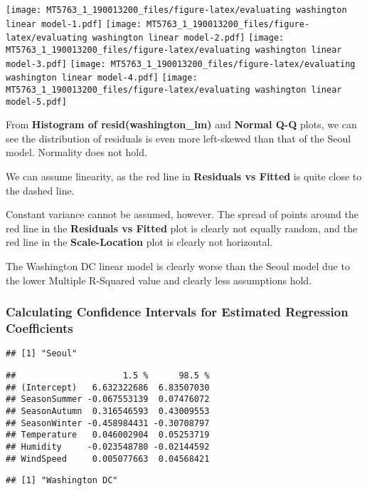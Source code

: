 \documentclass[]{article}
\begin{document}
\texttt{[image: MT5763\_1\_190013200\_files/figure-latex/evaluating washington linear model-1.pdf]}
\texttt{[image: MT5763\_1\_190013200\_files/figure-latex/evaluating washington linear model-2.pdf]}
\texttt{[image: MT5763\_1\_190013200\_files/figure-latex/evaluating washington linear model-3.pdf]}
\texttt{[image: MT5763\_1\_190013200\_files/figure-latex/evaluating washington linear model-4.pdf]}
\texttt{[image: MT5763\_1\_190013200\_files/figure-latex/evaluating washington linear model-5.pdf]}

From \textbf{Histogram of resid(washington\_lm)} and \textbf{Normal Q-Q}
plots, we can see the distribution of residuals is even more left-skewed
than that of the Seoul model. Normality does not hold.

We can assume linearity, as the red line in \textbf{Residuals vs Fitted}
is quite close to the dashed line.

Constant variance cannot be assumed, however. The spread of points
around the red line in the \textbf{Residuals vs Fitted} plot is clearly
not equally random, and the red line in the \textbf{Scale-Location} plot
is clearly not horizontal.

The Washington DC linear model is clearly worse than the Seoul model due
to the lower Multiple R-Squared value and clearly less assumptions hold.

\hypertarget{calculating-confidence-intervals-for-estimated-regression-coefficients}{%
\subsubsection{Calculating Confidence Intervals for Estimated Regression
Coefficients}\label{calculating-confidence-intervals-for-estimated-regression-coefficients}}

\begin{verbatim}
## [1] "Seoul"
\end{verbatim}

\begin{verbatim}
##                     1.5 %      98.5 %
## (Intercept)   6.632322686  6.83507030
## SeasonSummer -0.067553139  0.07476072
## SeasonAutumn  0.316546593  0.43009553
## SeasonWinter -0.458984431 -0.30708797
## Temperature   0.046002904  0.05253719
## Humidity     -0.023548780 -0.02144592
## WindSpeed     0.005077663  0.04568421
\end{verbatim}

\begin{verbatim}
## [1] "Washington DC"
\end{verbatim}
\end{document}
